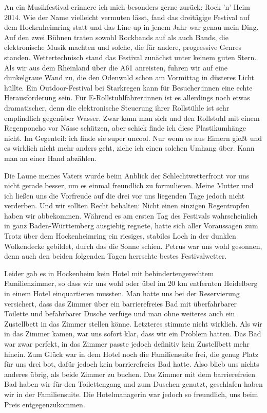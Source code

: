 \documentclass[fontsize=14pt,a4paper,headinclude,DIV=calc,automark]{scrbook}
\begin{document}
An ein Musikfestival erinnere ich mich besonders gerne zurück: Rock 'n' Heim 2014. Wie der Name vielleicht vermuten lässt, fand das dreitägige Festival auf dem Hockenheimring statt und das Line-up in jenem Jahr war genau mein Ding. Auf den zwei Bühnen traten sowohl Rockbands auf als auch Bands, die elektronische Musik machten und solche, die für andere, progressive Genres standen.
Wettertechnisch stand das Festival zunächst unter keinem guten Stern. Als wir aus dem Rheinland über die A61 anreisten, fuhren wir auf eine dunkelgraue Wand zu, die den Odenwald schon am Vormittag in düsteres Licht hüllte. Ein Outdoor-Festival bei Starkregen kann für Besucher:innen eine echte Herausforderung sein. Für E-Rollstuhlfahrer:innen ist es allerdings noch etwas dramatischer, denn die elektronische Steuerung ihrer Rollstühle ist sehr empfindlich gegenüber Wasser. Zwar kann man sich und den Rollstuhl mit einem Regenponcho vor Nässe schützen, aber schick finde ich diese Plastikumhänge nicht. Im Gegenteil: ich finde sie super uncool. Nur wenn es aus Eimern gießt und es wirklich nicht mehr anders geht, ziehe ich einen solchen Umhang über. Kann man an einer Hand abzählen.

Die Laune meines Vaters wurde beim Anblick der Schlechtwetterfront vor uns nicht gerade besser, um es einmal freundlich zu formulieren. Meine Mutter und ich ließen uns die Vorfreude auf die drei vor uns liegenden Tage jedoch nicht verderben. Und wir sollten Recht behalten: Nicht einen einzigen Regentropfen haben wir abbekommen. Während es am ersten Tag des Festivals wahrscheinlich in ganz Baden-Württemberg ausgiebig regnete, hatte sich aller Voraussagen zum Trotz über dem Hockenheimring ein riesiges, stabiles Loch in der dunklen Wolkendecke gebildet, durch das die Sonne schien. Petrus war uns wohl gesonnen, denn auch den beiden folgenden Tagen herrschte bestes Festivalwetter.

Leider gab es in Hockenheim kein Hotel mit behindertengerechtem Familienzimmer, so dass wir uns wohl oder übel im 20 km entfernten Heidelberg in einem Hotel einquartieren mussten. Man hatte uns bei der Reservierung versichert, dass das Zimmer über ein barrierefreies Bad mit überfahrbarer Toilette und befahrbarer Dusche verfüge und man ohne weiteres auch ein Zustellbett in das Zimmer stellen könne. Letzteres stimmte nicht wirklich. Als wir in das Zimmer kamen, war uns sofort klar, dass wir ein Problem hatten. Das Bad war zwar perfekt, in das Zimmer passte jedoch definitiv kein Zustellbett mehr hinein. Zum Glück war in dem Hotel noch die Familiensuite frei, die genug Platz für uns drei bot, dafür jedoch kein barrierefreies Bad hatte. Also blieb uns nichts anderes übrig, als beide Zimmer zu buchen. Das Zimmer mit dem barrierefreien Bad haben wir für den Toilettengang und zum Duschen genutzt, geschlafen haben wir in der Familiensuite. Die Hotelmanagerin war jedoch so freundlich, uns beim Preis entgegenzukommen.
\end{document}
